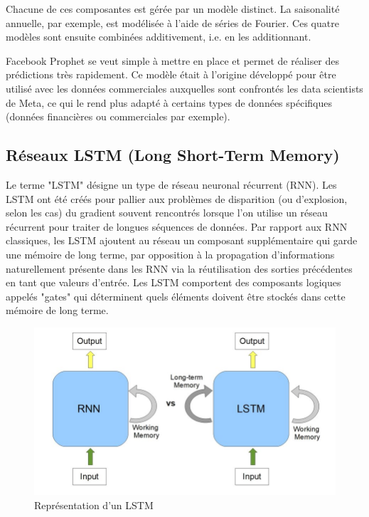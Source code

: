 \documentclass[french]{article}
\begin{document}
    Chacune de ces composantes est gérée par un modèle distinct. La saisonalité annuelle, par exemple, est modélisée à l'aide de séries de Fourier. Ces quatre modèles sont ensuite combinées additivement, i.e. en les additionnant.
    
    Facebook Prophet se veut simple à mettre en place et permet de réaliser des prédictions très rapidement. Ce modèle était à l'origine développé pour être utilisé avec les données commerciales auxquelles sont confrontés les data scientists de Meta, ce qui le rend plus adapté à certains types de données spécifiques (données financières ou commerciales par exemple). 
    
    \subsection{Réseaux LSTM (Long Short-Term Memory)}

    Le terme "LSTM" désigne un type de réseau neuronal récurrent (RNN). Les LSTM ont été créés pour pallier aux problèmes de disparition (ou d'explosion, selon les cas) du gradient souvent rencontrés lorsque l'on utilise un réseau récurrent pour traiter de longues séquences de données.
    Par rapport aux RNN classiques, les LSTM ajoutent au réseau un composant supplémentaire qui garde une mémoire de long terme, par opposition à la propagation d'informations naturellement présente dans les RNN via la réutilisation des sorties précédentes en tant que valeurs d'entrée. Les LSTM comportent des composants logiques appelés "gates" qui déterminent quels éléments doivent être stockés dans cette mémoire de long terme.

    
    \begin{figure}[h]
        \includegraphics[width=12cm]{RNNvsLSTM}
        \centering
        \caption{Représentation d'un LSTM}
        \centering
    \end{figure}
\end{document}
